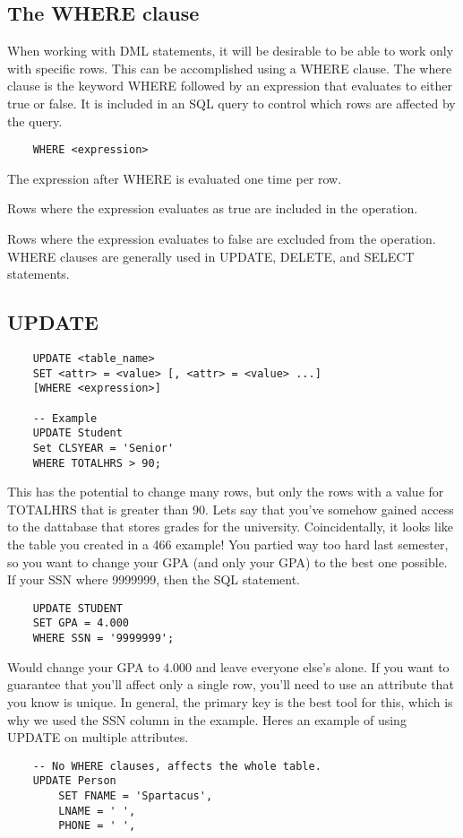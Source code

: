 \documentclass{report}
\begin{document}
    \subsection*{The WHERE clause}
    When working with DML statements, it will be desirable to be able to work only with specific rows. This can be accomplished using a WHERE clause.
    \bigbreak \noindent
    The where clause is the keyword WHERE followed by an expression that evaluates to either true or false. It is included in an SQL query to control which rows are affected by the query.
    \begin{verbatim}
    WHERE <expression> 
    \end{verbatim}
    The expression after WHERE is evaluated one time per row.
\item Rows where the expression evaluates as true are included in the operation.
\item Rows where the expression evaluates to false are excluded from the operation.
    \bigbreak \noindent
    WHERE clauses are generally used in UPDATE, DELETE, and SELECT statements.
    \subsection{UPDATE}
    \begin{verbatim}
    UPDATE <table_name> 
    SET <attr> = <value> [, <attr> = <value> ...]
    [WHERE <expression>]

    -- Example
    UPDATE Student
    Set CLSYEAR = 'Senior'
    WHERE TOTALHRS > 90;
    \end{verbatim}
    This has the potential to change many rows, but only the rows with a value for TOTALHRS that is greater than 90.
    \bigbreak \noindent
    Lets say that you've somehow gained access to the dattabase that stores grades for the university. Coincidentally, it looks like the table you created in a 466 example! You partied way too hard last semester, so you want to change your GPA (and only your GPA) to the best one possible. If your SSN where 9999999, then the SQL statement.
    \begin{verbatim}
    UPDATE STUDENT 
    SET GPA = 4.000
    WHERE SSN = '9999999';
    \end{verbatim}
    Would change your GPA to 4.000 and leave everyone else's alone.
    \bigbreak \noindent
    If you want to guarantee that you'll affect only a single row, you'll need to use an attribute that you know is unique. In general, the primary key is the best tool for this, which is why we used the SSN column in the example.
    \bigbreak \noindent
    Heres an example of using UPDATE on multiple attributes.
    \begin{verbatim}
    -- No WHERE clauses, affects the whole table.
    UPDATE Person 
        SET FNAME = 'Spartacus',
        LNAME = ' ',
        PHONE = ' ',
    \end{verbatim}
\end{document}
